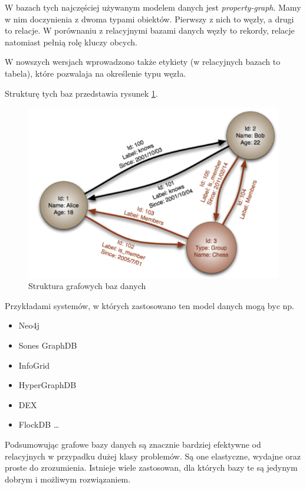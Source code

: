 \documentclass[twocolumn]{svjour3}          %
\begin{document}
W bazach tych najczęściej używanym modelem danych jest \emph{property-graph}. Mamy w nim doczynienia z dwoma typami obiektów. Pierwszy z nich to węzły, a drugi to relacje. W porównaniu z relacyjnymi bazami danych węzły to rekordy, relacje natomiast pełnią rolę kluczy obcych.

W nowszych wersjach wprowadzono także etykiety (w relacyjnych bazach to tabela), które pozwalaja na określenie typu węzła. 

Strukturę tych baz przedstawia rysunek \ref{fig:grafowe_bazy}.

\begin{figure}
    \centerline{\includegraphics[scale=0.6]{obrazki/grafowe_bazy.png}}
    \caption{Struktura grafowych baz danych}
    \label{fig:grafowe_bazy}       %
\end{figure}

Przykładami systemów, w których zastosowano ten model danych mogą byc np.
\begin{itemize}
    \item Neo4j
    \item Sones GraphDB
    \item InfoGrid
    \item HyperGraphDB
    \item DEX
    \item FlockDB \ldots
\end{itemize}

Podsumowując grafowe bazy danych są znacznie bardziej efektywne od relacyjnych w przypadku dużej klasy problemów. Są one elastyczne, wydajne oraz proste do zrozumienia. Istnieje wiele zastosowan, dla których bazy te są jedynym dobrym i możliwym rozwiązaniem.
\end{document}
